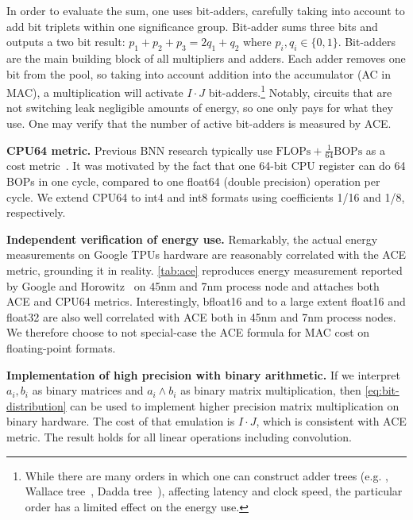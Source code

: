 In order to evaluate the sum, one uses bit-adders, carefully taking into account to add bit triplets within one significance group. Bit-adder sums three bits and outputs a two bit result: $p_1+p_2+p_3 = 2q_1 + q_2$ where $ p_i, q_i \in \{0, 1\}$. 
Bit-adders are the main building block of all  multipliers and adders. Each adder removes one bit from the pool, so taking into account addition into the accumulator (AC in MAC), a multiplication will activate $I \cdot J$ bit-adders.\footnote{While there are many orders in which one can construct adder trees (e.g. ,  Wallace tree~\cite{wallace1964multiplier}, Dadda tree~\cite{dadda1965parallelmultiplier}), affecting latency and clock speed, the particular order has a limited effect on the energy use.} Notably, circuits that are not switching leak negligible amounts of energy, so one only pays for what they use. One may verify that the number of active bit-adders is measured by ACE.

\textbf{CPU64 metric.} Previous BNN research typically use $\text{FLOPs} + \frac{1}{64}\text{BOPs}$ as a cost metric~\cite{rastegari2016xnornet, Liu2018bireal, Liu2020reactnet, liu2021adambnn}. It was motivated by the fact that one 64-bit CPU register can do 64 BOPs in one cycle, compared to one float64 (double precision) operation per cycle. We extend CPU64 to int4 and int8 formats using coefficients 1/16 and 1/8, respectively.

\textbf{Independent verification of energy use.} Remarkably, the actual energy measurements on Google TPUs hardware are reasonably correlated with the ACE metric, grounding it in reality. \ref{tab:ace} reproduces energy measurement reported by Google and Horowitz~\cite{jouppi2021lessons, horowitz2014energy} on 45nm and 7nm process node and attaches both ACE and CPU64 metrics. Interestingly, bfloat16 and to a large extent float16 and float32 are also well correlated with ACE both in 45nm and 7nm process nodes. We therefore choose to not special-case the ACE formula for MAC cost on floating-point formats.

\textbf{Implementation of high precision with binary arithmetic.} If we interpret $a_i, b_i$ as binary matrices and $a_i \wedge b_i$ as binary matrix multiplication, then \ref{eq:bit-distribution} can be used to implement higher precision matrix multiplication on binary hardware. The cost of that emulation is $I\cdot J$, which is consistent with ACE metric. The result holds for all linear operations including convolution.

